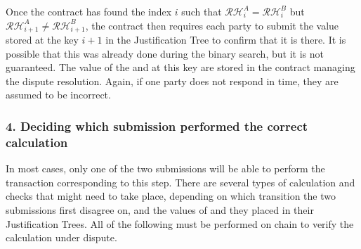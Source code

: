 Once the contract has found the index $i$ such that $\mathcal{RH}^A_{i}=\mathcal{RH}^B_{i}$ but $\mathcal{RH}^A_{i+1}\neq\mathcal{RH}^B_{i+1}$, the contract then requires each party to submit the value stored at the key $i+1$ in the Justification Tree to confirm that it is there. It is possible that this was already done during the binary search, but it is not guaranteed. The value of the  and  at this key are stored in the contract managing the dispute resolution. Again, if one party does not respond in time, they are assumed to be incorrect.

\subsubsection*{4. Deciding which submission performed the correct calculation}

In most cases, only one of the two submissions will be able to perform the transaction corresponding to this step. There are several types of calculation and checks that might need to take place, depending on which transition the two submissions first disagree on, and the values of  and  they placed in their Justification Trees. All of the following must be performed on chain to verify the calculation under dispute.


